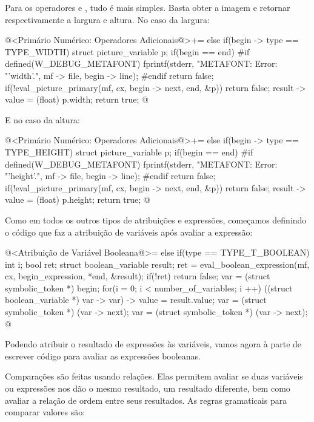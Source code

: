 {{{{{{Para os operadores  e , tudo é
mais simples. Basta obter a imagem e retornar respectivamente a
largura e altura. No caso da largura:

\iniciocodigo
@<Primário Numérico: Operadores Adicionais@>+=
else if(begin -> type == TYPE_WIDTH){
  struct picture_variable p;
  if(begin == end){
#if defined(W_DEBUG_METAFONT)
    fprintf(stderr, "METAFONT: Error: %
                    "'width'.\n", mf -> file, begin -> line);
#endif
    return false;
  }
  if(!eval_picture_primary(mf, cx, begin -> next, end, &p))
    return false;
  result -> value = (float) p.width;
  return true;
}
@
\fimcodigo

E no caso da altura:

\iniciocodigo
@<Primário Numérico: Operadores Adicionais@>+=
else if(begin -> type == TYPE_HEIGHT){
  struct picture_variable p;
  if(begin == end){
#if defined(W_DEBUG_METAFONT)
    fprintf(stderr, "METAFONT: Error: %
                    "'height'.\n", mf -> file, begin -> line);
#endif
    return false;
  }
  if(!eval_picture_primary(mf, cx, begin -> next, end, &p))
    return false;
  result -> value = (float) p.height;
  return true;
}
@
\fimcodigo



Como em todos os outros tipos de atribuições e expressões, começamos
definindo o código que faz a atribuição de variáveis após avaliar a
expressão:

\iniciocodigo
@<Atribuição de Variável Booleana@>=
else if(type == TYPE_T_BOOLEAN){
  int i;
  bool ret;
  struct boolean_variable result;
  ret = eval_boolean_expression(mf, cx, begin_expression, *end, &result);
  if(!ret)
    return false;
  var = (struct symbolic_token *) begin;
  for(i = 0; i < number_of_variables; i ++){
    ((struct boolean_variable *) var -> var) -> value = result.value;
    var = (struct symbolic_token *) (var -> next);
    var = (struct symbolic_token *) (var -> next);
  }
}
@
\fimcodigo

Podendo atribuir o resultado de expressões às variáveis, vamos agora à
parte de escrever código para avaliar as expressões booleanas.


Comparações são feitas usando relações. Elas permitem avaliar se duas
variáveis ou expressões nos dão o mesmo resultado, um resultado
diferente, bem como avaliar a relação de ordem entre seus
resultados. As regras gramaticais para comparar valores são:

}}}}}}
